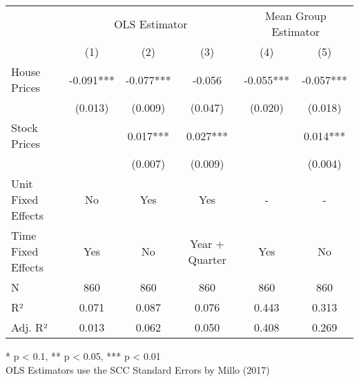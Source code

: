 \begin{table}[h]
\fontsize{9.0pt}{10.8pt}\selectfont
\begin{tabular*}{\linewidth}{@{\extracolsep{\fill}}lccccc}
\toprule
 & \multicolumn{3}{c}{OLS Estimator} & \multicolumn{2}{c}{Mean Group Estimator} \\ 
\cmidrule(lr){2-4} \cmidrule(lr){5-6}
  & (1) & (2) & (3) & (4) & (5) \\ 
\midrule\addlinespace[2.5pt]
House Prices & -0.091*** & -0.077*** & -0.056 & -0.055*** & -0.057*** \\ 
 & (0.013) & (0.009) & (0.047) & (0.020) & (0.018) \\ 
Stock Prices &  & 0.017*** & 0.027*** &  & 0.014*** \\ 
{} & {} & {(0.007)} & {(0.009)} & {} & {(0.004)} \\ 
\midrule
Unit Fixed Effects & No & Yes & Yes & - & - \\ 
Time Fixed Effects & Yes & No & Year + Quarter & Yes & No \\ 
\midrule
{N} & {860} & {860} & {860} & {860} & {860} \\ 
R² & 0.071 & 0.087 & 0.076 & 0.443 & 0.313 \\ 
Adj. R² & 0.013 & 0.062 & 0.050 & 0.408 & 0.269 \\ 
\bottomrule
\end{tabular*}
\begin{minipage}{\linewidth}
* p < 0.1, ** p < 0.05, *** p < 0.01\\
OLS Estimators use the SCC Standard Errors by Millo (2017)\\
\end{minipage}
\end{table}

